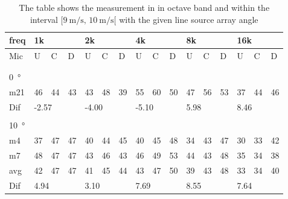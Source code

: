 \begin{table}[H]
\centering
\caption{The table shows the measurement in in octave band and within the interval $[\SI{9}{\meter\per\second},\, \SI{10}{\meter\per\second}[ $ with the given line source array angle}
\begin{tabular}{l|l|l|l|l|l|l|l|l|l|l|l|l|lll}
freq & \multicolumn{3}{l|}{1k} & \multicolumn{3}{l|}{2k} & \multicolumn{3}{l|}{4k} & \multicolumn{3}{l|}{8k} & \multicolumn{3}{l}{16k}                                \\ \hline
Mic  & U      & C      & D     & U      & C      & D     & U      & C      & D     & U      & C      & D     & \multicolumn{1}{l|}{U}  & \multicolumn{1}{l|}{C}  & D  \\ \hline
 & \multicolumn{3}{l|}{} & \multicolumn{3}{l|}{} & \multicolumn{3}{l|}{} & \multicolumn{3}{l|}{} & \multicolumn{3}{l}{}                                \\ 
 \multicolumn{16}{l}{ } \\   
\SI{0}{\degree}   & \multicolumn{3}{l|}{} & \multicolumn{3}{l|}{} & \multicolumn{3}{l|}{} & \multicolumn{3}{l|}{} & \multicolumn{3}{l}{}   \\  \hline
m21  & 46     & 44     & 43    & 43     & 48     & 39    & 55     & 60     & 50    & 47     & 56     & 53    & \multicolumn{1}{l|}{37} & \multicolumn{1}{l|}{44} & 46 \\ \hline 
Dif & \multicolumn{3}{l|}{-2.57} & \multicolumn{3}{l|}{-4.00} & \multicolumn{3}{l|}{-5.10} & \multicolumn{3}{l|}{5.98} & \multicolumn{3}{l}{8.46}  \\ 
 \multicolumn{16}{l}{ } \\                             
\SI{10}{\degree}   & \multicolumn{3}{l|}{} & \multicolumn{3}{l|}{} & \multicolumn{3}{l|}{} & \multicolumn{3}{l|}{} & \multicolumn{3}{l}{}   \\  \hline
m4    & 37     & 47     &  47    &  40    &  44    &   45   &  40    &  45     &  48    &  34     & 43     &  47    & \multicolumn{1}{l|}{30} & \multicolumn{1}{l|}{33} & 42 \\
m7    & 48     & 47     &  47    &   43   &   46   &  43    &  46    &  49     &  53    &  44     & 43     & 48     & \multicolumn{1}{l|}{35} & \multicolumn{1}{l|}{34} & 38 \\ \hline
avg &  42    &  47    & 47     &  41    &  45    & 44     & 43     &   47    &   50   &  39     & 43     &  48    & \multicolumn{1}{l|}{33} & \multicolumn{1}{l|}{34}  & 40  \\ \hline  
Dif & \multicolumn{3}{l|}{4.94} & \multicolumn{3}{l|}{3.10} & \multicolumn{3}{l|}{7.69} & \multicolumn{3}{l|}{8.55} & \multicolumn{3}{l}{7.64} \\ 

\end{tabular}
\end{table}
